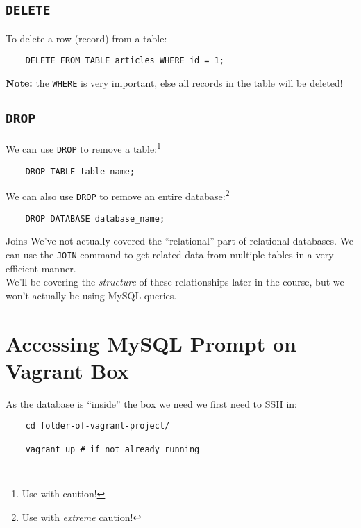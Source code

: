 {\subsection{\texttt{DELETE}}

To delete a row (record) from a table:

\begin{verbatim}
    DELETE FROM TABLE articles WHERE id = 1;
\end{verbatim}

\textbf{Note:} the \texttt{WHERE} is very important, else all records in the table will be deleted!

\subsection{\texttt{DROP}}

We can use \texttt{DROP} to remove a table:\footnote{Use with caution!}

\begin{verbatim}
    DROP TABLE table_name;
\end{verbatim}

We can also use \texttt{DROP} to remove an entire database:\footnote{Use with \textit{extreme} caution!}

\begin{verbatim}
    DROP DATABASE database_name;
\end{verbatim}

\begin{infobox}{Joins}
    We've not actually covered the ``relational'' part of relational databases. We can use the \texttt{JOIN} command to get related data from multiple tables in a very efficient manner.
    \\

    We'll be covering the \textit{structure} of these relationships later in the course, but we won't actually be using MySQL queries.
\end{infobox}

\section{Accessing MySQL Prompt on Vagrant Box}

As the database is ``inside'' the box we need we first need to SSH in:

\begin{verbatim}
    cd folder-of-vagrant-project/

    vagrant up # if not already running


\end{verbatim}}
